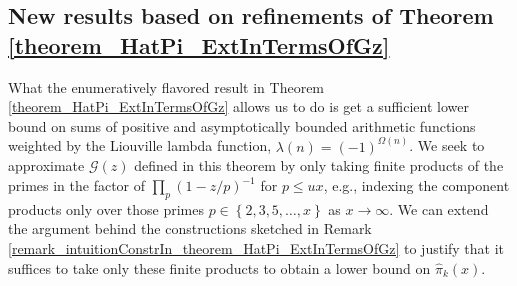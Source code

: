 \documentclass[11pt,reqno,a4letter]{article}
\numberwithin{figure}{section}
\numberwithin{table}{section}
\theoremstyle{plain}
\numberwithin{theorem}{section}
\theoremstyle{definition}
\begin{document}
\subsection{New results based on refinements of Theorem \ref{theorem_HatPi_ExtInTermsOfGz}} 
\label{subSection_PartialPrimeProducts_Proofs} 

What the enumeratively flavored result 
in Theorem \ref{theorem_HatPi_ExtInTermsOfGz} allows us to do is get a 
sufficient lower bound on sums of positive and asymptotically bounded arithmetic functions 
weighted by the Liouville lambda function, $\lambda(n) = (-1)^{\Omega(n)}$. 
We seek to approximate $\mathcal{G}(z)$ defined in this theorem 
by only taking finite products of the primes in the factor of 
$\prod_{p} (1 - z/p)^{-1}$ for 
$p \leq ux$, e.g., indexing the component products only over those primes 
$p \in \left\{2,3,5,\ldots,x\right\}$ as $x \rightarrow \infty$. 
We can extend the argument behind the constructions sketched in 
Remark \ref{remark_intuitionConstrIn_theorem_HatPi_ExtInTermsOfGz} to 
justify that it suffices to take only these finite products to obtain a lower bound on 
$\widehat{\pi}_k(x)$. 
\end{document}
